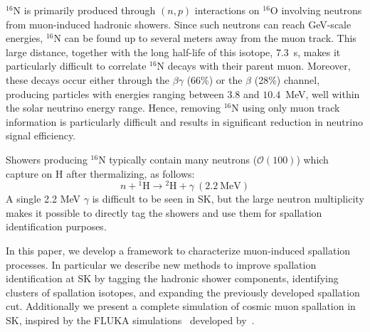 $^{16}\mbox{N}$ is primarily produced through $(n, p)$ interactions on $^{16}$O involving neutrons from muon-induced hadronic showers. Since such neutrons can reach GeV-scale energies,  $^{16}\mbox{N}$ can be found up to several meters away from the muon track. This large distance, together with the long half-life of this isotope, $7.3$~s, makes it particularly difficult to correlate $^{16}\mbox{N}$ decays with their parent muon. Moreover, these decays occur either through the $\beta\gamma$ (66\%) or the $\beta$ (28\%) channel, producing particles with energies ranging between $3.8$ and $10.4$~MeV, well within the solar neutrino energy range. Hence, removing $^{16}$N using only muon track information is particularly difficult and results in significant reduction in neutrino signal efficiency.

Showers producing $^{16}\mbox{N}$ typically contain many neutrons ($\mathcal{O}(100)$) \cite{BLi_comm} which capture on H after thermalizing, as follows:
\begin{equation}
    n + \mathrm{^1}\mbox{H} \rightarrow \mathrm{^{2}}\mbox{H} + \gamma\ (2.2\ \mbox{MeV})
\end{equation}
A single 2.2 MeV $\gamma$ is difficult to be seen in SK, but the large neutron multiplicity makes it possible to directly tag the showers and use them for spallation identification purposes. 

In this paper, we develop a framework to characterize muon-induced spallation processes. In particular we describe new methods to improve spallation identification at SK by tagging the hadronic shower components, identifying clusters of spallation isotopes, and expanding the previously developed spallation cut.  Additionally we present a complete simulation of cosmic muon spallation in SK, inspired by the FLUKA simulations~\cite{fluka_paper,Battistoni:2015epi} developed by~\cite{BLi_1}. 

